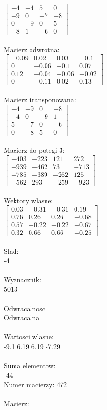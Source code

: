 \documentclass[a4paper,12pt]{article}
\begin{document}
$\begin{bmatrix} -4&-4&5&0\\-9&0&-7&-8\\0&-9&0&5\\-8&1&-6&0 \end{bmatrix}$
\\
\\
Macierz odwrotna:\\

$\begin{bmatrix} -0.09&0.02&0.03&-0.1\\0&-0.06&-0.1&0.07\\0.12&-0.04&-0.06&-0.02\\0&-0.11&0.02&0.13 \end{bmatrix}$
\\
\\
Macierz transponowana:\\

$\begin{bmatrix} -4&-9&0&-8\\-4&0&-9&1\\5&-7&0&-6\\0&-8&5&0 \end{bmatrix}$
\\
\\
Macierz do potegi 3:\\

$\begin{bmatrix} -403&-223&121&272\\-939&-462&73&-713\\-785&-389&-262&125\\-562&293&-259&-923 \end{bmatrix}$
\\
\\
Wektory wlasne:\\

$\begin{bmatrix} 0.03&-0.31&-0.31&0.19\\0.76&0.26&0.26&-0.68\\0.57&-0.22&-0.22&-0.67\\0.32&0.66&0.66&-0.25 \end{bmatrix}$
\\
\\
Slad:\\
-4
\\
\\
Wyznacznik:\\
5013
\\
\\
Odwracalnosc:\\
Odwracalna
\\
\\
Wartosci wlasne:\\
-9.1 6.19 6.19 -7.29
\\
\\
Suma elementow:\\
-44
\\
\newpage
Numer macierzy:
472
\\
\\
Macierz:\\
\end{document}

